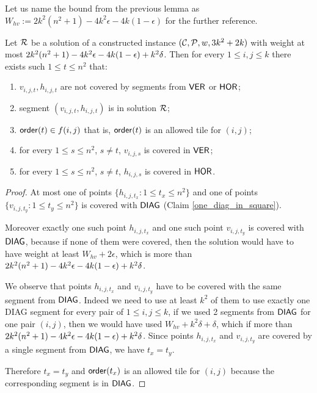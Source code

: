 {{{{Let us name the bound from the previous lemma
as $W_{hv} := 2k^2(n^2+1) -4k^2\epsilon -4k(1-\epsilon)$
for the further reference.

\begin{lemma}
\label{diag_correct}
Let $\mathcal{R}$ be a solution 
of a constructed instance $(\mathcal{C}, \mathcal{P}, w, 3k^2+2k)$
with weight at most  $2k^2(n^2+1) - 4k^2\epsilon -4k(1-\epsilon) +k^2\delta$.
Then for every $1 \le i,j \le k$
there exists such $1 \le t \le n^2$ that:
\begin{enumerate}[label={(\arabic*)}]
\item $v_{i,j,t}, h_{i,j,t}$ are not covered by segments from $\mathsf{VER}$ or $\mathsf{HOR}$;
\item segment $(v_{i,j,t}, h_{i,j,t})$ is in solution $\mathcal{R}$;
\item $\mathsf{order}(t) \in f(i,j)$ that is, $\mathsf{order}(t)$ is an allowed tile for $(i,j)$;
\item for every $1 \le s\le n^2$, $s \neq t$, $v_{i,j,s}$ is covered in $\mathsf{VER}$;
\item for every $1 \le s\le n^2$, $s \neq t$, $h_{i,j,s}$ is covered in $\mathsf{HOR}$.
\end{enumerate}
\end{lemma}

\begin{proof}
At most one of points $\{h_{i,j,t_x} : 1 \le t_x \le n^2\}$
and one of points $\{v_{i,j,t_y} : 1 \le t_y \le n^2\}$
is covered with $\mathsf{DIAG}$
(Claim \ref{one_diag_in_square}).
	
Moreover exactly one such point $h_{i,j,t_x}$ and one such point $v_{i,j,t_y}$
is covered with $\mathsf{DIAG}$,
because if none of them were covered, then the solution would have to
have weight at least $W_{hv} + 2\epsilon$, which is more than $2k^2(n^2+1) - 4k^2\epsilon -4k(1-\epsilon) +k^2\delta$.

We observe that points $h_{i,j,t_x}$ and $v_{i,j,t_y}$
have to be covered with the same segment from $\mathsf{DIAG}$.
Indeed we need to use at least $k^2$ of them to use
exactly one DIAG segment for every pair of $1 \le i,j \le k$,
if we used 2 segments from $\mathsf{DIAG}$
for one pair $(i,j)$,
then we would have used $W_{hv} + k^2\delta + \delta$,
which if more than $2k^2(n^2+1) - 4k^2\epsilon -4k(1-\epsilon) +k^2\delta$.
Since points $h_{i,j,t_x}$ and $v_{i,j,t_y}$ are covered by
a single segment from $\mathsf{DIAG}$, we have $t_x = t_y$.

Therefore $t_x = t_y$
and $\mathsf{order}(t_x)$ is an allowed tile for $(i,j)$
because the corresponding segment is in $\mathsf{DIAG}$.
\end{proof}

\newcommand{\diagonal}{\mathsf{diagonal}}

}}}}
